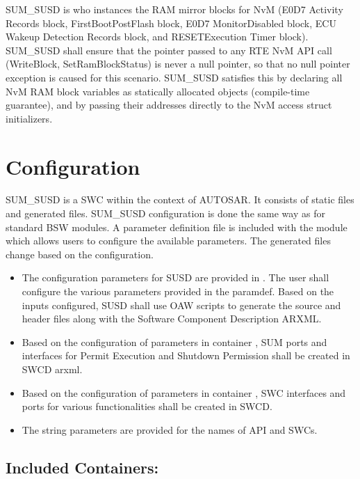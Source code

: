 {
SUM\_SUSD is who instances the RAM mirror blocks for NvM (E0D7 Activity Records block, FirstBootPostFlash block, E0D7 MonitorDisabled block, ECU Wakeup Detection Records block, and RESETExecution Timer block). SUM\_SUSD shall ensure that the pointer passed to any RTE NvM API call (WriteBlock, SetRamBlockStatus) is never a null pointer, so that no null pointer exception is caused for this scenario.
SUM\_SUSD satisfies this by declaring all NvM RAM block variables as statically allocated objects (compile-time guarantee), and by passing their addresses directly to the NvM access struct initializers.
}
{ }

\section{Configuration}

SUM_SUSD is a SWC within the context of AUTOSAR.
It consists of static files and generated files.
SUM_SUSD configuration is done the same way as for standard BSW modules.
A parameter definition file is included with the module which allows users to configure the available parameters.
The generated files change based on the configuration.

\begin{itemize}
\item The configuration parameters for SUSD are provided in .
The user shall configure the various parameters provided in the paramdef.
Based on the inputs configured, SUSD shall use OAW scripts to generate the source and header files along with the Software Component Description ARXML.
\item Based on the configuration of parameters in container , SUM ports and interfaces for Permit Execution and Shutdown Permission shall be created in SWCD arxml.
\item Based on the configuration of parameters in container , SWC interfaces and ports for various functionalities shall be created in SWCD.
\item The string parameters are provided for the names of API and SWCs.
\end{itemize}

\subsection{Included Containers:}

